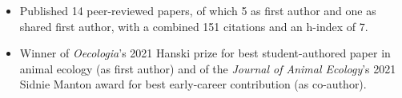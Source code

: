 


\begin{itemize}[noitemsep] 
  \item Published 14 peer-reviewed papers, of which 5 as first author and one as shared first author, with a combined 151 citations and an h-index of 7.
  \item Winner of \textit{Oecologia}'s 2021 Hanski prize for best student-authored paper in animal ecology (as first author) and of the \textit{Journal of Animal Ecology}'s 2021 Sidnie Manton award for best early-career contribution (as co-author).
\end{itemize}